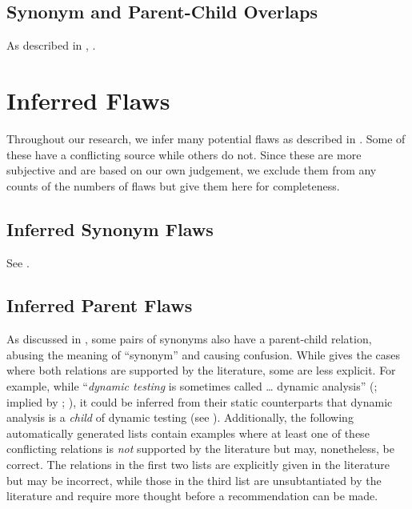 \subsection{Synonym and Parent-Child Overlaps}\label{parSyns-full}
As described in , \parSynIntro*{}.
\begin{landscape}
    
\end{landscape}

\section{Inferred Flaws}\label{infer-flaws}
Throughout our research, we infer many potential flaws as described in
. Some of these have a conflicting source while others do not.
Since these are more subjective and are based on our own judgement, we
exclude them from any counts of the numbers of flaws but give them here for
completeness.

\subsection{Inferred Synonym Flaws}\label{infMultiSyns}
See .

\begin{enumerate}
    
\end{enumerate}

\subsection{Inferred Parent Flaws}\label{infParSyns}
As discussed in , some pairs of synonyms also have a
parent-child relation, abusing the meaning of ``synonym'' and causing
confusion. While  gives the cases where both relations
are supported by the literature, some are less explicit. For example, while
``\emph{dynamic testing} is sometimes called \dots{} dynamic analysis''
(\citealp[p.~438]{PetersAndPedrycz2000}; implied by
\citealp[p.~149]{IEEE2017}; \citealpISTQB{}), it could be inferred from
their static counterparts that dynamic analysis is a \emph{child} of dynamic
testing (see \citealp[pp.~9, 17, 25, 28]{IEEE2022}). Additionally, the
following automatically generated lists contain examples where at least
one of these conflicting relations is \emph{not} supported by the
literature but may, nonetheless, be correct. The relations in the first two
lists are explicitly given in the literature but may be incorrect, while
those in the third list are unsubtantiated by the literature and require
more thought before a recommendation can be made.

